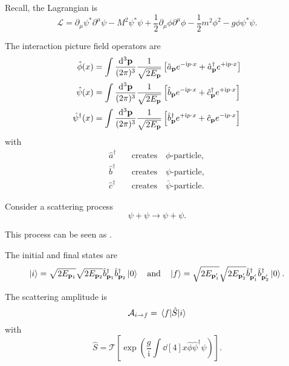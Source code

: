 \documentclass[a4paper,11pt]{article}
\begin{document}
	Recall, the Lagrangian is 
	\[
		\mathcal{L} = \partial_\mu \psi^* \partial^\mu \psi - M^2 \psi^* \psi + \frac{1}{2} \partial_\mu \phi \partial^\mu \phi - \frac{1}{2} m^2 \phi^2 - g \phi \psi^* \psi.
	\]
	
	The interaction picture field operators are
	\begin{align*}
		\hat \phi(x) &= \int \frac{\dd[3]{\vb p}}{(2\pi)^{3}} \frac{1}{\sqrt{2 E _{\vb p}}} \left[ \hat a _{\vb p} e ^{- \mathrm{i} p \cdot x} + \hat a^{\dagger}_{\vb p} e ^{+ \mathrm{i} p \cdot x} \right]\\
		\hat \psi(x) &= \int \frac{\dd[3]{\vb p}}{(2\pi)^{3}} \frac{1}{\sqrt{2 E _{\vb p}}} \left[ \hat b _{\vb p} e ^{- \mathrm{i} p \cdot x} + \hat c^{\dagger}_{\vb p} e ^{+ \mathrm{i} p \cdot x} \right]\\
		\hat \psi^{\dagger}(x) &= \int \frac{\dd[3]{\vb p}}{(2\pi)^{3}} \frac{1}{\sqrt{2 E _{\vb p}}} \left[ \hat b^{\dagger} _{\vb p} e ^{+ \mathrm{i} p \cdot x} + \hat c_{\vb p} e ^{- \mathrm{i} p \cdot x} \right]
	\end{align*}
	with
	\begin{align*}
		\hat a^{\dagger} \quad &\text{creates} \quad \text{$\phi$-particle},\\
		\hat b^{\dagger} \quad &\text{creates} \quad \text{$\psi$-particle},\\
		\hat c^{\dagger} \quad &\text{creates} \quad \text{$\bar \psi$-particle}.
	\end{align*}
	
	Consider a scattering process
	\[
		\psi + \psi \to \psi + \psi.
	\]

	This process can be seen as .

	The initial and final states are
	\[
		\ket{i} = \sqrt{2 E _{\vb p_1}} \sqrt{2 E _{\vb p_2}} \hat b^{\dagger}_{\vb p_1} \hat b^{\dagger}_{\vb p_2} \ket{0} \quad \text{and} \quad \ket{f} = \sqrt{2 E _{\vb p'_1}} \sqrt{2 E _{\vb p'_2}} \hat b^{\dagger} _{\vb p'_1} \hat b^{\dagger}_{\vb p'_2} \ket{0}.
	\]
	
	The scattering amplitude is
	\[
		\mathcal{A}_{i \to f} = \mel{f}{\hat S}{i}
	\]
	with
	\[
		\hat S = \mathcal{T}\left[ \exp(\frac{g}{\mathrm{i}}\int \dd[4]{x} \hat \phi \hat \psi^{\dagger}\hat \psi) \right].
	\]
	
\end{document}
